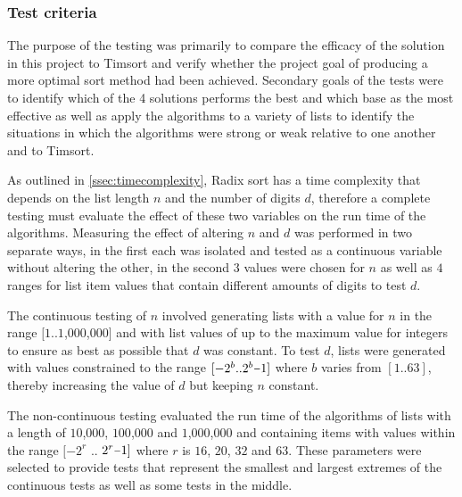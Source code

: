 \documentclass[12pt]{article}
\newcommand{\minus}{\scalebox{0.75}[1.0]{$-$}}
\begin{document}
\begin{table}[h]
	\centering
	
\end{table}

	\pagebreak
	\subsubsection{Test criteria}
	The purpose of the testing was primarily to compare the efficacy of the solution in this project to Timsort and verify whether the project goal of producing a more optimal sort method had been achieved. Secondary goals of the tests were to identify which of the 4 solutions performs the best and which base as the most effective as well as apply the algorithms to a variety of lists to identify the situations in which the algorithms were strong or weak relative to one another and to Timsort.
	\par
	As outlined in \ref{ssec:timecomplexity}, Radix sort has a time complexity that depends on the list length $n$ and the number of digits $d$, therefore a complete testing must evaluate the effect of these two variables on the run time of the algorithms. Measuring the effect of altering $n$ and $d$ was performed in two separate ways, in the first each was isolated and tested as a continuous variable without altering the other, in the second $3$ values were chosen for $n$ as well as $4$ ranges for list item values that contain different amounts of digits to test $d$. 
	\par
	The continuous testing of $n$ involved generating lists with a value for $n$ in the range $[1..1$,$000$,$000]$ and with list values of up to the maximum value for integers to ensure as best as possible that $d$ was constant. To test $d$, lists were generated with values constrained to the range $[-2^b..2^b\minus1]$ where $b$ varies from $[1..63]$, thereby increasing the value of $d$ but keeping $n$ constant.
	\par
	The non-continuous testing evaluated the run time of the algorithms of lists with a length of $10$,$000$, $100$,$000$ and $1$,$000$,$000$ and containing items with values within the range $[-2^{r}$ $..$ $2^{r}\minus1]$ where $r$ is $16$, $20$, $32$ and $63$. These parameters were selected to provide tests that represent the smallest and largest extremes of the continuous tests as well as some tests in the middle. 
\end{document}
